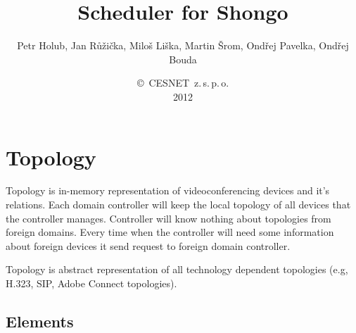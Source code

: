 \documentclass[a4paper]{report}
\begin{document}
\title{Scheduler for Shongo}
\author{Petr Holub, Jan Růžička, Miloš Liška, Martin Šrom, Ondřej Pavelka, Ondřej Bouda}
\date{\copyright~CESNET~z.\,s.\,p.\,o.\\2012}
\maketitle
\tableofcontents


\chapter{Topology}

Topology is in-memory representation of videoconferencing devices and it's relations. Each domain controller will keep the local topology of all devices that the controller manages.
Controller will know nothing about topologies from foreign domains. Every time when the controller will need some information about foreign devices it send request to foreign domain controller.

Topology is abstract representation of all technology dependent topologies (e.g, H.323, SIP, Adobe Connect topologies).

\section{Elements}
\end{document}
